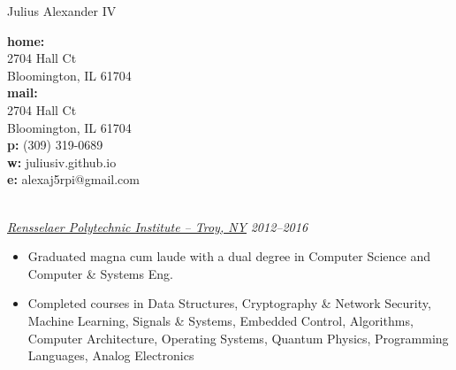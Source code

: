 \documentclass[11pt]{article} %
\begin{document}
\title{}
\centerline{ {\Huge \sc Julius Alexander IV} }

\begin{multicols}{3}
\noindent \textbf{home:} \\
2704 Hall Ct \\
Bloomington, IL 61704 \\

\noindent \textbf{mail:} \\
2704 Hall Ct \\
Bloomington, IL 61704 \\

\noindent \textbf{p:} (309) 319-0689 \\
\noindent \textbf{w:} juliusiv.github.io \\
\noindent \textbf{e:} alexaj5rpi@gmail.com
\end{multicols}


 \hrulefill\\
\noindent
\underline{\textit{Rensselaer Polytechnic Institute -- Troy, NY}} \hfill \textit{2012--2016}

\begin{itemize}[noitemsep]
\renewcommand\labelitemi{$\circ$}

\item Graduated magna cum laude with a dual degree in Computer Science and Computer \& Systems Eng.
\item Completed courses in Data Structures, Cryptography \& Network Security, Machine Learning, Signals \& Systems, Embedded Control, Algorithms, Computer Architecture, Operating Systems, Quantum Physics, Programming Languages, Analog Electronics
\end{itemize}

\end{document}
